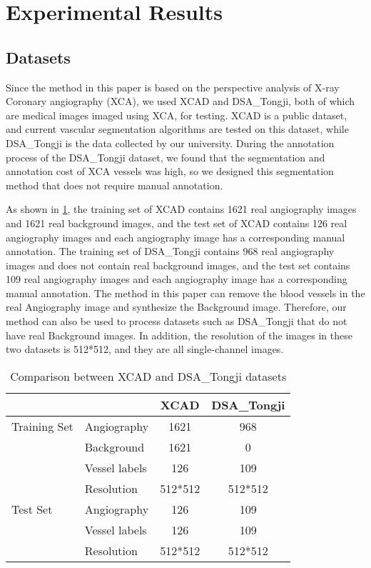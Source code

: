 \section{Experimental Results}


\subsection{Datasets}

Since the method in this paper is based on the perspective analysis of X-ray Coronary angiography (XCA), we used XCAD and DSA\_Tongji, both of which are medical images imaged using XCA, for testing. XCAD is a public dataset, and current vascular segmentation algorithms are tested on this dataset, while DSA\_Tongji is the data collected by our university. During the annotation process of the DSA\_Tongji dataset, we found that the segmentation and annotation cost of XCA vessels was high, so we designed this segmentation method that does not require manual annotation.

As shown in \cref{tab:myT02}, the training set of XCAD contains 1621 real angiography images and 1621 real background images, 
and the test set of XCAD contains 126 real angiography images and each angiography image has a corresponding manual annotation. 
The training set of DSA\_Tongji contains 968 real angiography images and does not contain real background images, 
and the test set contains 109 real angiography images and each angiography image has a corresponding manual annotation. 
The method in this paper can remove the blood vessels in the real Angiography image and synthesize the Background image. 
Therefore, our method can also be used to process datasets such as DSA\_Tongji that do not have real Background images. 
In addition, the resolution of the images in these two datasets is 512*512, and they are all single-channel images.

\begin{table}[h]
    \centering
    \caption{Comparison between XCAD and DSA\_Tongji datasets}
    \label{tab:comparison}
    \begin{tabular}{llcc}
    \toprule
    \textbf{} & \textbf{} & \textbf{XCAD} & \textbf{DSA\_Tongji} \\
    \midrule
    \multirow{}{}{Training Set} 
    & Angiography & 1621 & 968 \\
    & Background & 1621 & 0 \\
    & Vessel labels & 126 & 109 \\
    & Resolution & 512*512 & 512*512 \\
    \midrule
    \multirow{}{}{Test Set} 
    & Angiography & 126 & 109 \\
    & Vessel labels & 126 & 109 \\
    & Resolution & 512*512 & 512*512 \\
    \bottomrule
    \end{tabular}
    \label{tab:myT02}
\end{table}

